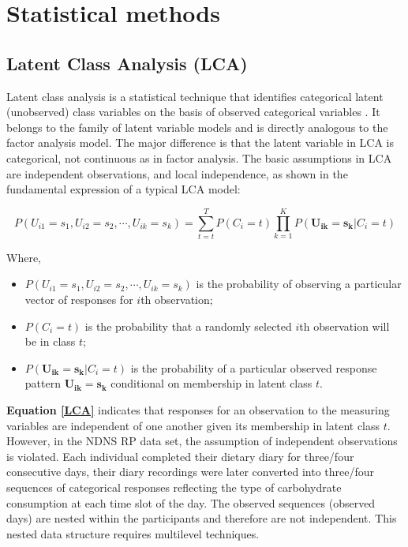 \section[Statistical methods]{Statistical methods}

\subsection{Latent Class Analysis (LCA)}\vspace{-0.3cm}

Latent class analysis is a statistical technique that identifies categorical latent (unobserved) class variables on the basis of observed categorical variables \parencite{collins2010latent}. It belongs to the family of latent variable models and is directly analogous to the factor analysis model. The major difference is that the latent variable in LCA is categorical, not continuous as in factor analysis. The basic assumptions in LCA are independent observations, and local independence, as shown in the fundamental expression of a typical LCA model: \vspace{-0.8cm}

\begin{equation}
P(U_{i1} = s_1, U_{i2} = s_2, \cdots, U_{ik} = s_k) = \sum_{t=t}^{T}P(C_i = t)\prod_{k = 1}^{K}P(\mathbf{U_{ik}} = \mathbf{s_k} | C_i = t)
\label{LCA}
\end{equation}\vspace{-0.7cm}

Where, 

\begin{itemize}
	\item $P(U_{i1} = s_1, U_{i2} = s_2, \cdots, U_{ik} = s_k)$ is the probability of observing a particular vector of responses for $i$th observation;
	\item $P(C_i = t)$ is the probability that a randomly selected $i$th observation will be in class $t$;
	\item $P(\mathbf{U_{ik}} = \mathbf{s_k} | C_i = t)$ is the probability of a particular observed response pattern $\mathbf{U_{ik}} = \mathbf{s_k}$ conditional on membership in latent class $t$.
\end{itemize}


\textbf{Equation \ref{LCA}} indicates that responses for an observation to the measuring variables are independent of one another given its membership in latent class $t$. However, in the NDNS RP data set, the assumption of independent observations is violated. Each individual completed their dietary diary for three/four consecutive days, their diary recordings were later converted into three/four sequences of categorical responses reflecting the type of carbohydrate consumption at each time slot of the day. The observed sequences (observed days) are nested within the participants and therefore are not independent. This nested data structure requires multilevel techniques. 
\vspace{-0.3cm}

